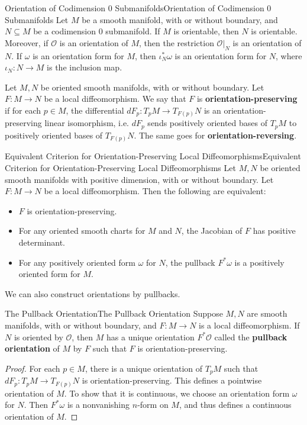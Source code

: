 \documentclass[../main.tex]{subfiles}
\begin{document}
\begin{proposition}{Orientation of Codimension 0 Submanifolds}{Orientation of Codimension 0 Submanifolds}
  Let $M$ be a smooth manifold, with or without boundary, and $N \subseteq M$ be a codimension 0 submanifold. If $M$ is orientable, then $N$ is orientable. Moreover, if $\mathcal{O}$ is an orientation of $M$, then the restriction $\mathcal{O}|_N$ is an orientation of $N$. If $\omega$ is an orientation form for $M$, then $\iota_N^* \omega$ is an orientation form for $N$, where $\iota_N : N \to M$ is the inclusion map.
\end{proposition}

Let $M,N$ be oriented smooth manifolds, with or without boundary. Let $F: M \to N$ be a local diffeomorphism. We say that $F$ is \textbf{orientation-preserving} if for each $p \in M$, the differential $dF_p : T_pM \to T_{F(p)}N$ is an orientation-preserving linear isomorphism, i.e. $dF_p$ sends positively oriented bases of $T_pM$ to positively oriented bases of $T_{F(p)}N$. The same goes for \textbf{orientation-reversing}.

\begin{proposition}{Equivalent Criterion for Orientation-Preserving Local Diffeomorphisms}{Equivalent Criterion for Orientation-Preserving Local Diffeomorphisms}
  Let $M,N$ be oriented smooth manifolds with positive dimension, with or without boundary. Let $F: M \to N$ be a local diffeomorphism. Then the following are equivalent:
  \begin{itemize}
    \item $F$ is orientation-preserving.
    \item For any oriented smooth charts for $M$ and $N$, the Jacobian of $F$ has positive determinant.
    \item For any positively oriented form $\omega$ for $N$, the pullback $F^* \omega$ is a positively oriented form for $M$.
  \end{itemize}
\end{proposition}

We can also construct orientations by pullbacks.
\begin{proposition}{The Pullback Orientation}{The Pullback Orientation}
  Suppose $M,N$ are smooth manifolds, with or without boundary, and $F: M \to N$ is a local diffeomorphism. If $N$ is oriented by $\mathcal{O}$, then $M$ has a unique orientation $F^*\mathcal{O}$ called the \textbf{pullback orientation} of $M$ by $F$ such that $F$ is orientation-preserving.
\end{proposition}
\begin{proof}
  For each $p\in M$, there is a unique orientation of $T_pM$ such that $dF_p : T_pM \to T_{F(p)}N$ is orientation-preserving. This defines a pointwise orientation of $M$. To show that it is continuous, we choose an orientation form $\omega$ for $N$. Then $F^* \omega$ is a nonvanishing $n$-form on $M$, and thus defines a continuous orientation of $M$.
\end{proof}
\end{document}
